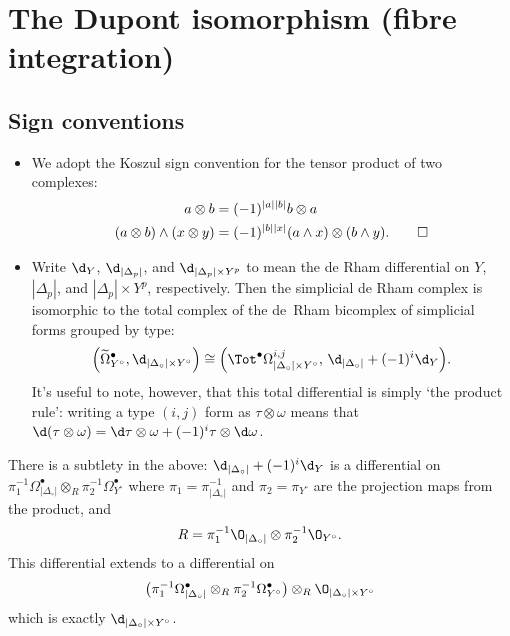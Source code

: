 
\section{The Dupont isomorphism (fibre integration)} %
\label{sec:the_dupont_isomorphism}

    \subsection*{Sign conventions} %
    \label{sub:sign_conventions}

        \begin{itemize}
            \item We adopt the Koszul sign convention for the tensor product of two complexes:
                \begin{align*}
                    a\otimes b &= (-1)^{|a||b|}b\otimes a\\
                    (a\otimes b)\wedge(x\otimes y) &= (-1)^{|b||x|}(a\wedge x)\otimes(b\wedge y).\qedhere
                \end{align*}
            \item Write $\d_Y$, $\d_{|\Delta_p|}$, and $\d_{|\Delta_p|\times Y^p}$ to mean the de Rham differential on $Y$, $|\Delta_p|$, and $|\Delta_p|\times Y^p$, respectively.
                Then the simplicial de Rham complex is isomorphic to the total complex of the de~Rham bicomplex of simplicial forms grouped by type:
                \[
                    \Big(\widetilde{\Omega}^\bullet_{Y^\circ},\d_{|\Delta_\circ|\times Y^\circ}\Big) \cong \Big(\Tot^\bullet\Omega^{i,j}_{|\Delta_\circ|\times Y^\circ},\, \d_{|\Delta_\circ|}+(-1)^i\d_Y\Big).
                \]
                It's useful to note, however, that this total differential is simply `the product rule': writing a type $(i,j)$ form as $\tau\otimes\omega$ means that $\d(\tau\otimes\omega)=\d\tau\otimes\omega + (-1)^i\tau\otimes\d\omega$.
        \end{itemize}

        There is a subtlety in the above: $\d_{|\Delta_\circ|}+(-1)^i\d_Y$ is a differential on $\pi_1^{-1}\Omega_{|\Delta_\circ|}^\bullet\otimes_R \pi_2^{-1}\Omega_{Y^\circ}^\bullet$ where $\pi_1 = \pi_{|\Delta_\circ|}^{-1}$ and $\pi_2 = \pi_{Y^\circ}$ are the projection maps from the product, and
        \[
            R=\pi_1^{-1}\O_{|\Delta_\circ|}\otimes\pi_2^{-1}\O_{Y^\circ}.
        \]
        This differential extends to a differential on
        \[
            \big(\pi_1^{-1}\Omega_{|\Delta_\circ|}^\bullet\otimes_R \pi_2^{-1}\Omega_{Y^\circ}^\bullet\big)\otimes_R \O_{|\Delta_\circ|\times Y^\circ}
        \]
        which is exactly $\d_{|\Delta_\circ|\times Y^\circ}$.

